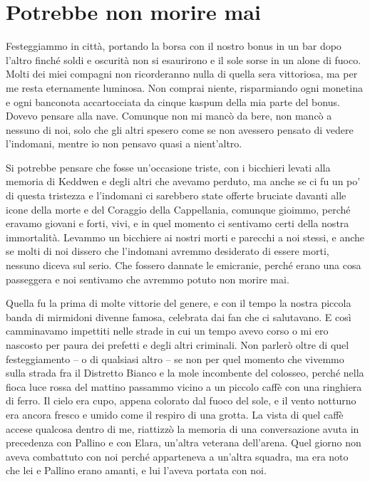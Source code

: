 \chapter{Potrebbe non morire mai}

Festeggiammo in città, portando la borsa con il nostro bonus in un bar
dopo l'altro finché soldi e oscurità non si esaurirono e il sole sorse
in un alone di fuoco. Molti dei miei compagni non ricorderanno nulla di
quella sera vittoriosa, ma per me resta eternamente luminosa. Non
comprai niente, risparmiando ogni monetina e ogni banconota
accartocciata da cinque kaspum della mia parte del bonus. Dovevo pensare
alla nave. Comunque non mi mancò da bere, non mancò a nessuno di noi,
solo che gli altri spesero come se non avessero pensato di vedere
l'indomani, mentre io non pensavo quasi a nient'altro.

Si potrebbe pensare che fosse un'occasione triste, con i bicchieri
levati alla memoria di Keddwen e degli altri che avevamo perduto, ma
anche se ci fu un po' di questa tristezza e l'indomani ci sarebbero
state offerte bruciate davanti alle icone della morte e del Coraggio
della Cappellania, comunque gioimmo, perché eravamo giovani e forti,
vivi, e in quel momento ci sentivamo certi della nostra immortalità.
Levammo un bicchiere ai nostri morti e parecchi a noi stessi, e anche se
molti di noi dissero che l'indomani avremmo desiderato di essere morti,
nessuno diceva sul serio. Che fossero dannate le emicranie, perché erano
una cosa passeggera e noi sentivamo che avremmo potuto non morire mai.

Quella fu la prima di molte vittorie del genere, e con il tempo la
nostra piccola banda di mirmidoni divenne famosa, celebrata dai fan che
ci salutavano. E così camminavamo impettiti nelle strade in cui un tempo
avevo corso o mi ero nascosto per paura dei prefetti e degli altri
criminali. Non parlerò oltre di quel festeggiamento -- o di qualsiasi
altro -- se non per quel momento che vivemmo sulla strada fra il
Distretto Bianco e la mole incombente del colosseo, perché nella fioca
luce rossa del mattino passammo vicino a un piccolo caffè con una
ringhiera di ferro. Il cielo era cupo, appena colorato dal fuoco del
sole, e il vento notturno era ancora fresco e umido come il respiro di
una grotta. La vista di quel caffè accese qualcosa dentro di me,
riattizzò la memoria di una conversazione avuta in precedenza con
Pallino e con Elara, un'altra veterana dell'arena. Quel giorno non aveva
combattuto con noi perché apparteneva a un'altra squadra, ma era noto
che lei e Pallino erano amanti, e lui l'aveva portata con noi.

